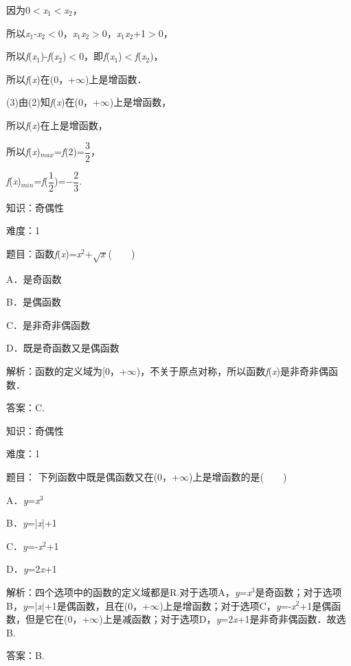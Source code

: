 \documentclass{article} %
\begin{document}
因为0$\mathrm{<}$\textit{x}${}_{1}$$\mathrm{<}$\textit{x}${}_{2}$，

所以\textit{x}${}_{1}$-\textit{x}${}_{2}$$\mathrm{<}$0，\textit{x}${}_{1}$\textit{x}${}_{2}$$\mathrm{>}$0，\textit{x}${}_{1}$\textit{x}${}_{2}$+1$\mathrm{>}$0，

所以\textit{f}(\textit{x}${}_{1}$)-\textit{f}(\textit{x}${}_{2}$)$\mathrm{<}$0，即\textit{f}(\textit{x}${}_{1}$)$\mathrm{<}$\textit{f}(\textit{x}${}_{2}$)，

所以\textit{f}(\textit{x})在(0，+$\mathrm{\infty}$)上是增函数．

(3)由(2)知\textit{f}(\textit{x})在(0，+$\mathrm{\infty}$)上是增函数，

所以\textit{f}(\textit{x})在上是增函数，

所以\textit{f}(\textit{x})${}_{max}$=\textit{f}(2)=$\dfrac{3}{2}$，

\textit{f}(\textit{x})${}_{min}$=\textit{f}($\dfrac{1}{2}$)=$-\dfrac{2}{3}$.

知识：奇偶性

难度：1

题目：函数\textit{f}(\textit{x})=\textit{x}${}^{2}$+$\sqrt{x}$(　　)

A．是奇函数

B．是偶函数

C．是非奇非偶函数

D．既是奇函数又是偶函数

解析：函数的定义域为[0，+$\mathrm{\infty}$)，不关于原点对称，所以函数\textit{f}(\textit{x})是非奇非偶函数．

答案：C.

知识：奇偶性

难度：1

题目：
下列函数中既是偶函数又在(0，+$\mathrm{\infty}$)上是增函数的是(　　)

A．\textit{y}=\textit{x}${}^{3}$　　　　　　 

B．\textit{y}=|\textit{x}|+1

C．\textit{y}=-\textit{x}${}^{2}$+1   

D．\textit{y}=2\textit{x}+1

解析：四个选项中的函数的定义域都是R.对于选项A，\textit{y}=\textit{x}${}^{3}$是奇函数；对于选项B，\textit{y}=|\textit{x}|+1是偶函数，且在(0，+$\mathrm{\infty}$)上是增函数；对于选项C，\textit{y}=-\textit{x}${}^{2}$+1是偶函数，但是它在(0，+$\mathrm{\infty}$)上是减函数；对于选项D，\textit{y}=2\textit{x}+1是非奇非偶函数．故选B.

答案：B.
\end{document}
